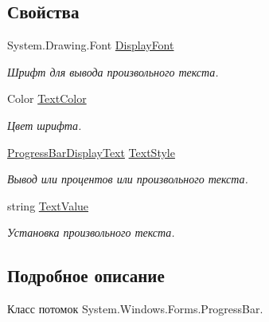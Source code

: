\subsection*{Свойства}
\begin{DoxyCompactItemize}
\item 
System.\+Drawing.\+Font \mbox{\hyperlink{class_f_b_a_1_1_progress_bar_f_b_a_adebd70575557c2b3f32473af012a477e}{Display\+Font}}
\begin{DoxyCompactList}\small\item\em Шрифт для вывода произвольного текста. \end{DoxyCompactList}\item 
Color \mbox{\hyperlink{class_f_b_a_1_1_progress_bar_f_b_a_a855ba1a8b8a6bd80cd4ac2ba69926f15}{Text\+Color}}
\begin{DoxyCompactList}\small\item\em Цвет шрифта. \end{DoxyCompactList}\item 
\mbox{\hyperlink{namespace_f_b_a_a3379f961332d4dfe27911508655249b2}{Progress\+Bar\+Display\+Text}} \mbox{\hyperlink{class_f_b_a_1_1_progress_bar_f_b_a_a3b5aa95a85495f4da92512c763ffbfa3}{Text\+Style}}
\begin{DoxyCompactList}\small\item\em Вывод или процентов или произвольного текста. \end{DoxyCompactList}\item 
string \mbox{\hyperlink{class_f_b_a_1_1_progress_bar_f_b_a_a464443c878e8ec305ed49b457fff9ea9}{Text\+Value}}
\begin{DoxyCompactList}\small\item\em Установка произвольного текста. \end{DoxyCompactList}\end{DoxyCompactItemize}


\subsection{Подробное описание}
Класс потомок System.\+Windows.\+Forms.\+Progress\+Bar. 



